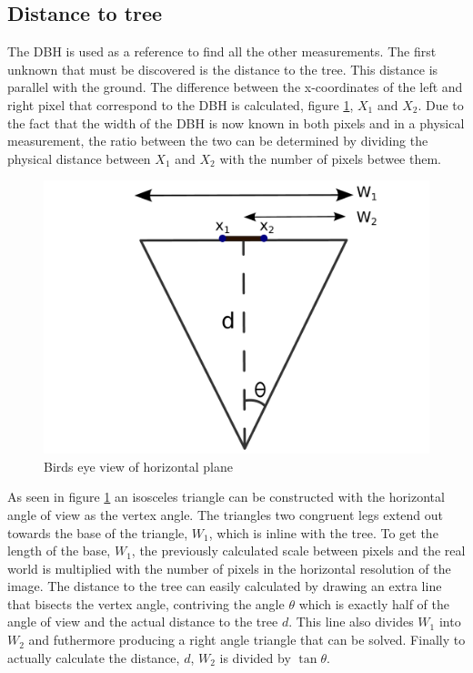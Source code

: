 \subsection{Distance to tree}
The DBH is used as a reference to find all the other measurements. The first
unknown that must be discovered is the distance to the tree. This distance is 
parallel with the ground. The difference between the x-coordinates of the left 
and right pixel that correspond to the DBH is calculated, figure 
\ref{horizontal_triangle}, $X_1$ and $X_2$. Due to the fact that the width of
the DBH is now known in both pixels and in a physical measurement, the ratio
between the two can be determined by dividing the physical distance between 
$X_1$ and $X_2$ with the number of pixels betwee them.
\begin{figure}[htp]
\centering
{
	\includegraphics[scale=0.3]{horizontal_triangle.pdf}
	\caption{Birds eye view of horizontal plane}
	\label{horizontal_triangle}
}
\end{figure}
 As seen in figure \ref{horizontal_triangle} an isosceles triangle can be 
 constructed with the horizontal angle of view as the vertex angle. The triangles 
 two congruent legs extend out towards the base of the triangle, $W_1$, which 
 is inline with the tree. To get the length of the base, $W_1$, the previously 
 calculated scale between pixels and the real world is multiplied with the 
 number of pixels in the horizontal resolution of the image. The distance to 
 the tree can easily calculated by drawing an extra line that bisects the vertex
 angle, contriving the angle $\theta$ which is exactly half of the angle of view 
 and the actual distance to the tree $d$. This line also divides $W_1$ into $W_2$ 
 and futhermore producing a right angle triangle that can be solved. Finally to 
 actually calculate the distance, $d$, $W_2$ is divided by $\tan{\theta}$.


